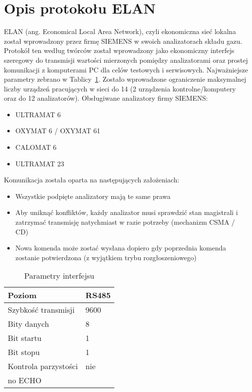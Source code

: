 \section{Opis protokołu ELAN}

ELAN (ang. Economical Local Area Network), czyli ekonomiczna sieć lokalna został wprowadzony przez firmę SIEMENS w swoich analizatorach składu gazu. Protokół ten według twórców został wprowadzony jako ekonomiczny interfejs szeregowy do transmisji wartości mierzonych pomiędzy analizatorami oraz prostej komunikacji z komputerami PC dla celów testowych i serwisowych. Najważniejsze parametry zebrano w Tablicy~\ref{tab:parametry}.
Zostało wprowadzone ograniczenie maksymalnej liczby urządzeń pracujących w sieci do 14 (2 urządzenia kontrolne/komputery oraz do 12 analizatorów). Obsługiwane analizatory firmy SIEMENS:
\begin{itemize}
\item ULTRAMAT 6
\item OXYMAT 6 / OXYMAT 61
\item CALOMAT 6
\item ULTRAMAT 23
\end{itemize}
Komunikacja została oparta na następujących założeniach:
\begin{itemize}
\item Wszystkie podpięte analizatory mają te same prawa
\item Aby uniknąć konfliktów, każdy analizator musi sprawdzić stan magistrali i zatrzymać transmisję natychmiast w razie potrzeby (mechanizm CSMA / CD)
\item Nowa komenda może zostać wysłana dopiero gdy poprzednia komenda zostanie potwierdzona (z wyjątkiem trybu rozgłoszeniowego)
\end{itemize}

\begin{table}[h]
\centering
\begin{tabular}{|l|l|}
\hline Poziom & RS485 \\ 
\hline Szybkość transmisji & 9600 \\ 
\hline Bity danych & 8 \\ 
\hline Bit startu & 1 \\ 
\hline Bit stopu & 1 \\ 
\hline Kontrola parzystości & nie \\ 
\hline no ECHO &  \\ 
\hline 
\end{tabular} 
\caption{Parametry interfejsu}
\label{tab:parametry}
\end{table}

